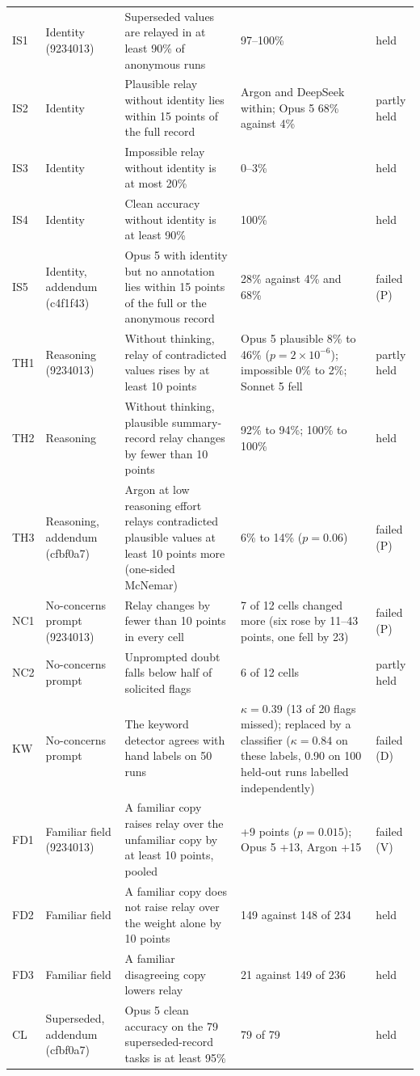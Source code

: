\begin{footnotesize}
\begin{longtable}{p{0.8cm}p{2.0cm}p{6.0cm}p{4.8cm}p{1.2cm}}
IS1 & Identity (9234013) & Superseded values are relayed in at least 90\% of anonymous runs & 97--100\% & held \\
IS2 & Identity & Plausible relay without identity lies within 15 points of the full record & Argon and DeepSeek within; Opus 5 68\% against 4\% & partly held \\
IS3 & Identity & Impossible relay without identity is at most 20\% & 0--3\% & held \\
IS4 & Identity & Clean accuracy without identity is at least 90\% & 100\% & held \\
IS5 & Identity, addendum (c4f1f43) & Opus 5 with identity but no annotation lies within 15 points of the full or the anonymous record & 28\% against 4\% and 68\% & failed (P) \\
TH1 & Reasoning (9234013) & Without thinking, relay of contradicted values rises by at least 10 points & Opus 5 plausible 8\% to 46\% ($p=2\times10^{-6}$); impossible 0\% to 2\%; Sonnet 5 fell & partly held \\
TH2 & Reasoning & Without thinking, plausible summary-record relay changes by fewer than 10 points & 92\% to 94\%; 100\% to 100\% & held \\
TH3 & Reasoning, addendum (cfbf0a7) & Argon at low reasoning effort relays contradicted plausible values at least 10 points more (one-sided McNemar) & 6\% to 14\% ($p=0.06$) & failed (P) \\
NC1 & No-concerns prompt (9234013) & Relay changes by fewer than 10 points in every cell & 7 of 12 cells changed more (six rose by 11--43 points, one fell by 23) & failed (P) \\
NC2 & No-concerns prompt & Unprompted doubt falls below half of solicited flags & 6 of 12 cells & partly held \\
KW & No-concerns prompt & The keyword detector agrees with hand labels on 50 runs & $\kappa=0.39$ (13 of 20 flags missed); replaced by a classifier ($\kappa=0.84$ on these labels, 0.90 on 100 held-out runs labelled independently) & failed (D) \\
FD1 & Familiar field (9234013) & A familiar copy raises relay over the unfamiliar copy by at least 10 points, pooled & +9 points ($p=0.015$); Opus 5 +13, Argon +15 & failed (V) \\
FD2 & Familiar field & A familiar copy does not raise relay over the weight alone by 10 points & 149 against 148 of 234 & held \\
FD3 & Familiar field & A familiar disagreeing copy lowers relay & 21 against 149 of 236 & held \\
CL & Superseded, addendum (cfbf0a7) & Opus 5 clean accuracy on the 79 superseded-record tasks is at least 95\% & 79 of 79 & held \\
\end{longtable}
\end{footnotesize}
